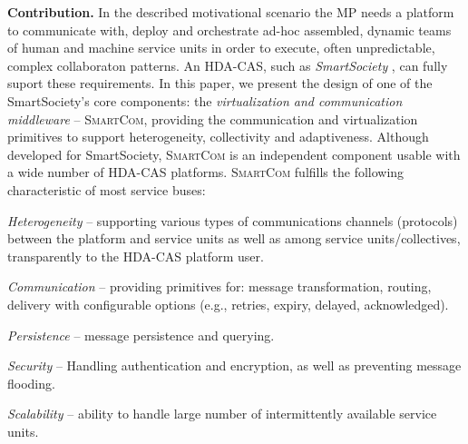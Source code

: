 \documentclass{llncs}
\newcommand{\mdl}{\textsc{SmartCom}}
\begin{document}
  \textbf{Contribution. }
  In the described motivational scenario the MP needs a platform to communicate with, deploy and orchestrate ad-hoc assembled, dynamic teams of human and machine service units in order to execute, often unpredictable, complex collaboraton patterns. An HDA-CAS, such as \textit{SmartSociety} \cite{SmartSocBook}, can fully suport these  requirements. In this paper, we present the design of one of the SmartSociety's core components: the \emph{virtualization and communication middleware} -- \mdl{}, providing the communication and virtualization primitives to support heterogeneity, collectivity and adaptiveness. Although developed for SmartSociety, \mdl{} is an independent component usable with a wide number of HDA-CAS platforms.
%
%
%
   \mdl{} fulfills the following characteristic of most service buses:
     \begin{inparaenum}[a) \itshape]
        \item \textit{Heterogeneity} -- supporting various types of communications channels (protocols) between the platform and service units as well as among service units/collectives, transparently to the HDA-CAS platform user.
        \item \textit{Communication} -- providing primitives for: message transformation, routing, delivery with configurable options (e.g., retries, expiry, delayed, acknowledged).
        \item \textit{Persistence} -- message persistence and querying.
        \item \textit{Security} -- Handling authentication and encryption, as well as preventing message flooding.
        \item \textit{Scalability} -- ability to handle large number of intermittently available service units.
      \end{inparaenum}
\end{document}

